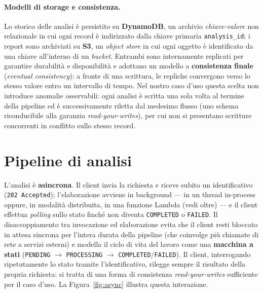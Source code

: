 \documentclass[11pt,a4paper]{article}
\begin{document}
\paragraph{Modelli di storage e consistenza.} Lo storico delle analisi è persistito su
\textbf{DynamoDB}, un archivio \emph{chiave-valore} non relazionale in cui ogni record è
indirizzato dalla chiave primaria \texttt{analysis\_id}; i report sono archiviati su
\textbf{S3}, un \emph{object store} in cui ogni oggetto è identificato da una chiave
all'interno di un \emph{bucket}. Entrambi sono internamente replicati per garantire
durabilità e disponibilità e adottano un modello a \textbf{consistenza finale}
(\emph{eventual consistency}): a fronte di una scrittura, le repliche convergono verso
lo stesso valore entro un intervallo di tempo. Nel nostro caso d'uso questa scelta non
introduce anomalie osservabili: ogni analisi è scritta una sola volta al termine della
pipeline ed è successivamente riletta dal medesimo flusso (uno schema riconducibile alla
garanzia \emph{read-your-writes}), per cui non si presentano scritture concorrenti in
conflitto sullo stesso record.

\section{Pipeline di analisi}
L'analisi è \textbf{asincrona}. Il client invia la richiesta e riceve subito un
identificativo (\texttt{202 Accepted}); l'elaborazione avviene in background --- in un
thread in-process oppure, in modalità distribuita, in una funzione Lambda (vedi oltre) ---
e il client effettua \emph{polling} sullo stato finché non diventa
\texttt{COMPLETED} o \texttt{FAILED}. Il disaccoppiamento tra invocazione ed
elaborazione evita che il client resti bloccato in attesa sincrona per l'intera durata
della pipeline (che coinvolge più chiamate di rete a servizi esterni) e modella il ciclo
di vita del lavoro come una \textbf{macchina a stati} (\texttt{PENDING}
$\rightarrow$ \texttt{PROCESSING} $\rightarrow$ \texttt{COMPLETED}/\texttt{FAILED}). Il
client, interrogando ripetutamente lo stato tramite l'identificativo, rilegge sempre il
risultato della propria richiesta: si tratta di una forma di consistenza
\emph{read-your-writes} sufficiente per il caso d'uso. La Figura~\ref{fig:async}
illustra questa interazione.
\end{document}
